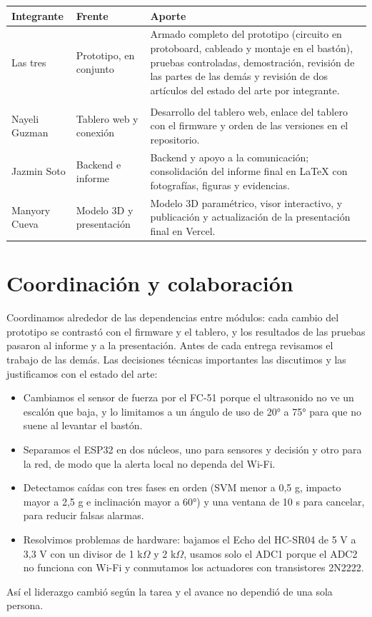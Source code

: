\documentclass[12pt,a4paper]{article}
\begin{document}
\vspace{0.5ex}
\begin{tabular}{@{}>{\raggedright\arraybackslash}p{3cm} >{\raggedright\arraybackslash}p{4.2cm} >{\raggedright\arraybackslash}p{7.2cm}@{}}
\hline
\textbf{Integrante} & \textbf{Frente} & \textbf{Aporte} \\
\hline
Las tres & Prototipo, en conjunto & Armado completo del prototipo (circuito en protoboard, cableado y montaje en el bastón), pruebas controladas, demostración, revisión de las partes de las demás y revisión de dos artículos del estado del arte por integrante. \\
\hline
\multicolumn{3}{@{}l}{\textit{Además, cada una lideró un frente propio:}} \\
Nayeli Guzman & Tablero web y conexión & Desarrollo del tablero web, enlace del tablero con el firmware y orden de las versiones en el repositorio. \\
Jazmin Soto & Backend e informe & Backend y apoyo a la comunicación; consolidación del informe final en \LaTeX{} con fotografías, figuras y evidencias. \\
Manyory Cueva & Modelo 3D y presentación & Modelo 3D paramétrico, visor interactivo, y publicación y actualización de la presentación final en Vercel. \\
\hline
\end{tabular}

\section{Coordinación y colaboración}
Coordinamos alrededor de las dependencias entre módulos: cada cambio del prototipo se contrastó con el firmware y el tablero, y los resultados de las pruebas pasaron al informe y a la presentación. Antes de cada entrega revisamos el trabajo de las demás. Las decisiones técnicas importantes las discutimos y las justificamos con el estado del arte:
\begin{itemize}
\item Cambiamos el sensor de fuerza por el FC-51 porque el ultrasonido no ve un escalón que baja, y lo limitamos a un ángulo de uso de 20° a 75° para que no suene al levantar el bastón.
\item Separamos el ESP32 en dos núcleos, uno para sensores y decisión y otro para la red, de modo que la alerta local no dependa del Wi-Fi.
\item Detectamos caídas con tres fases en orden (SVM menor a 0,5 g, impacto mayor a 2,5 g e inclinación mayor a 60°) y una ventana de 10 s para cancelar, para reducir falsas alarmas.
\item Resolvimos problemas de hardware: bajamos el Echo del HC-SR04 de 5 V a 3,3 V con un divisor de 1 k$\Omega$ y 2 k$\Omega$, usamos solo el ADC1 porque el ADC2 no funciona con Wi-Fi y conmutamos los actuadores con transistores 2N2222.
\end{itemize}
Así el liderazgo cambió según la tarea y el avance no dependió de una sola persona.
\end{document}
